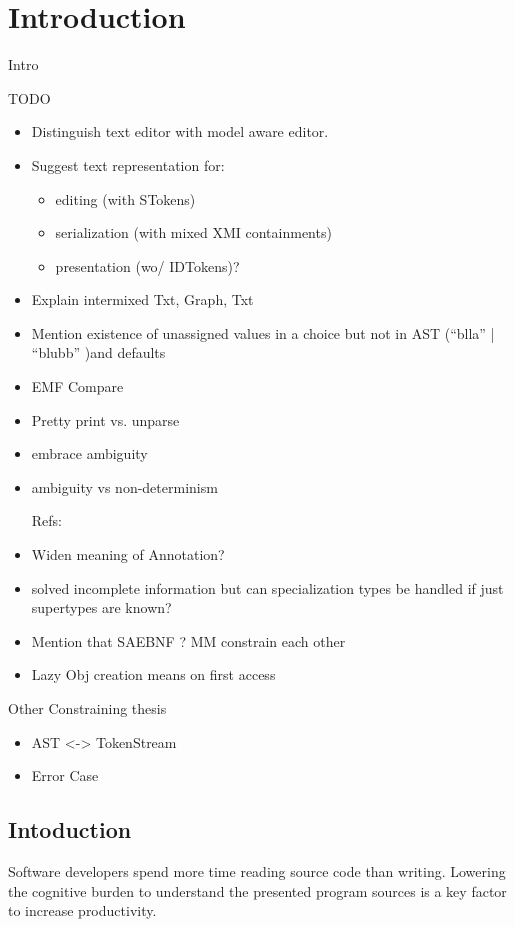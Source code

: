 \chapter{Introduction}
\label{cha:introduction}
Intro

TODO
\begin{itemize}
	\item Distinguish text editor with model aware editor.
	\item Suggest text representation for: 
	\begin{itemize}
		\item editing (with STokens)
		\item serialization (with mixed XMI containments)
		\item presentation (wo/ IDTokens)?
	\end{itemize}
	
	\item Explain intermixed Txt, Graph, Txt
	\item Mention existence of unassigned values in a choice but not in AST (``blla'' | ``blubb'' )and defaults
	\item EMF Compare
	\item Pretty print vs. unparse

	\item embrace ambiguity
	\item ambiguity vs non-determinism

	

Refs:
	\item Widen meaning of Annotation?
	\item solved incomplete information but can specialization types be handled if just supertypes are known? 
	\item Mention that SAEBNF ? MM constrain each other
	\item Lazy Obj creation means on first access
	\end{itemize}

Other Constraining thesis
\begin{itemize}
	\item AST <-> TokenStream
	\item Error Case
\end{itemize}
\section{Intoduction}
Software developers spend more time reading source code than writing. Lowering the cognitive burden to understand the presented program sources is a key factor to increase productivity. \\

